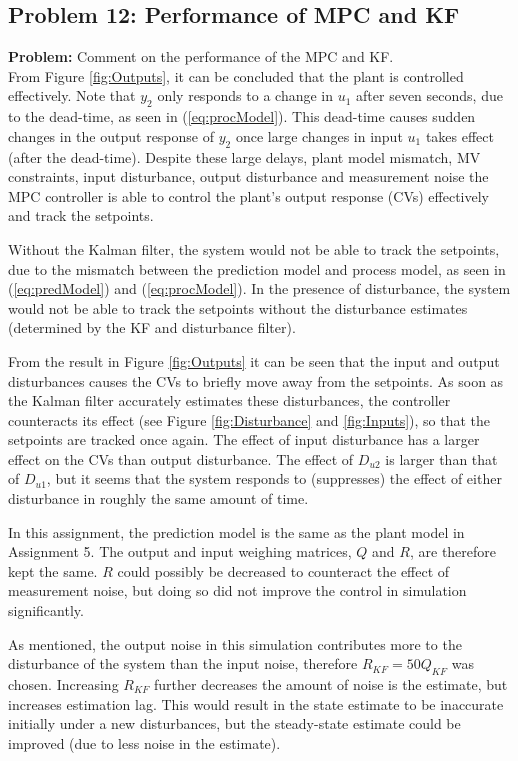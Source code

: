 \documentclass[12pt]{article}
\begin{document}
\subsection{Problem 12: Performance of MPC and KF}

\textbf{Problem:} Comment on the performance of the MPC and KF. \\

From Figure \ref{fig:Outputs}, it can be concluded that the plant is controlled effectively. Note that $y_2$ only responds to a change in $u_1$ after seven seconds, due to the dead-time, as seen in (\ref{eq:procModel}). This dead-time causes sudden changes in the output response of $y_2$ once large changes in input $u_1$ takes effect (after the dead-time). Despite these large delays, plant model mismatch, MV constraints, input disturbance, output disturbance and measurement noise the MPC controller is able to control the plant's output response (CVs) effectively and track the setpoints.

Without the Kalman filter, the system would not be able to track the setpoints, due to the mismatch between the prediction model and process model, as seen in (\ref{eq:predModel}) and (\ref{eq:procModel}). In the presence of disturbance, the system would not be able to track the setpoints without the disturbance estimates (determined by the KF and disturbance filter).

From the result in Figure \ref{fig:Outputs} it can be seen that the input and output disturbances causes the CVs to briefly move away from the setpoints. As soon as the Kalman filter accurately estimates these disturbances, the controller counteracts its effect (see Figure \ref{fig:Disturbance} and \ref{fig:Inputs}), so that the setpoints are tracked once again. The effect of input disturbance has a larger effect on the CVs than output disturbance. The effect of $D_{u2}$ is larger than that of $D_{u1}$, but it seems that the system responds to (suppresses) the effect of either disturbance in roughly the same amount of time.

In this assignment, the prediction model is the same as the plant model in Assignment 5. The output and input weighing matrices, $Q$ and $R$, are therefore kept the same. $R$ could possibly be decreased to counteract the effect of measurement noise, but doing so did not improve the control in simulation significantly.

As mentioned, the output noise in this simulation contributes more to the disturbance of the system than the input noise, therefore  $R_{KF}=50 Q_{KF}$ was chosen. Increasing $R_{KF}$ further decreases the amount of noise is the estimate, but increases estimation lag. This would result in the state estimate to be inaccurate initially under a new disturbances, but the steady-state estimate could be improved (due to less noise in the estimate).
\end{document}
